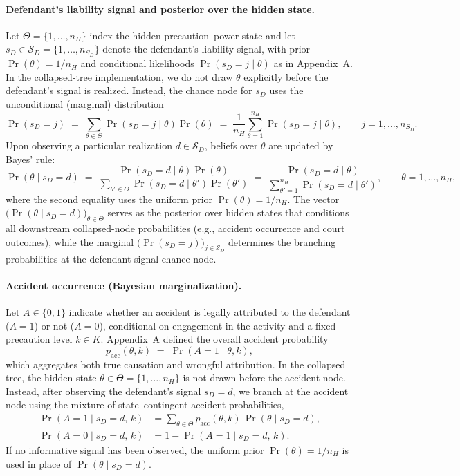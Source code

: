 \documentclass{article}
\begin{document}
\paragraph{Defendant’s liability signal and posterior over the hidden state.} 
Let $\Theta=\{1,\dots,n_H\}$ index the hidden precaution–power state and let $s_D\in\mathcal{S}_D=\{1,\dots,n_{S_D}\}$ denote the defendant’s liability signal, with prior $\Pr(\theta)=1/n_H$ and conditional likelihoods $\Pr(s_D=j\mid \theta)$ as in Appendix~A. In the collapsed-tree implementation, we do not draw $\theta$ explicitly before the defendant’s signal is realized. Instead, the chance node for $s_D$ uses the unconditional (marginal) distribution \[ \Pr(s_D=j) \;=\; \sum_{\theta\in\Theta}\Pr(s_D=j\mid \theta)\Pr(\theta) \;=\; \frac{1}{n_H}\sum_{\theta=1}^{n_H}\Pr(s_D=j\mid \theta), \qquad j=1,\dots,n_{S_D}. \] Upon observing a particular realization $d\in\mathcal{S}_D$, beliefs over $\theta$ are updated by Bayes’ rule: \[ \Pr(\theta\mid s_D=d) \;=\; \frac{\Pr(s_D=d\mid \theta)\Pr(\theta)}{\sum_{\theta'\in\Theta}\Pr(s_D=d\mid \theta')\Pr(\theta')} \;=\; \frac{\Pr(s_D=d\mid \theta)}{\sum_{\theta'=1}^{n_H}\Pr(s_D=d\mid \theta')}, \qquad \theta=1,\dots,n_H, \] where the second equality uses the uniform prior $\Pr(\theta)=1/n_H$. The vector $\bigl(\Pr(\theta\mid s_D=d)\bigr)_{\theta\in\Theta}$ serves as the posterior over hidden states that conditions all downstream collapsed-node probabilities (e.g., accident occurrence and court outcomes), while the marginal $\bigl(\Pr(s_D=j)\bigr)_{j\in\mathcal{S}_D}$ determines the branching probabilities at the defendant-signal chance node.

\paragraph{Accident occurrence (Bayesian marginalization).}
Let $A\in\{0,1\}$ indicate whether an accident is legally attributed to the defendant ($A=1$) or not ($A=0$), conditional on engagement in the activity and a fixed precaution level $k\in K$. Appendix~A defined the overall accident probability
\[
p_{\mathrm{acc}}(\theta,k) \;=\; \Pr(A=1 \mid \theta,k),
\]
which aggregates both true causation and wrongful attribution. In the collapsed tree, the hidden state $\theta\in\Theta=\{1,\dots,n_H\}$ is not drawn before the accident node. Instead, after observing the defendant’s signal $s_D=d$, we branch at the accident node using the mixture of state–contingent accident probabilities,
\[
\begin{aligned}
\Pr(A=1 \mid s_D=d,\,k) 
   &= \sum_{\theta\in\Theta} p_{\mathrm{acc}}(\theta,k)\,\Pr(\theta \mid s_D=d), \\
\Pr(A=0 \mid s_D=d,\,k) 
   &= 1-\Pr(A=1 \mid s_D=d,\,k).
\end{aligned}
\]
If no informative signal has been observed, the uniform prior $\Pr(\theta)=1/n_H$ is used in place of $\Pr(\theta \mid s_D=d)$.
\end{document}
